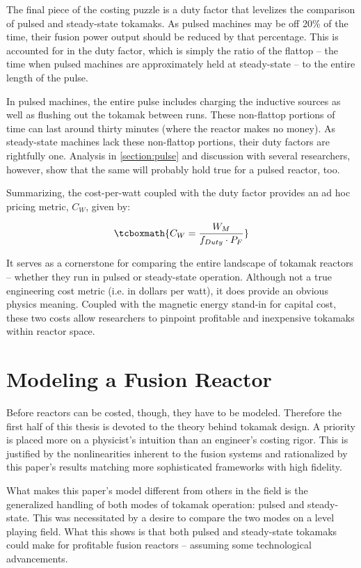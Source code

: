 The final piece of the costing puzzle is a duty factor that levelizes the comparison of pulsed and steady-state tokamaks. As pulsed machines may be off 20\% of the time, their fusion power output should be reduced by that percentage. This is accounted for in the duty factor, which is simply the ratio of the flattop -- the time when pulsed machines are approximately held at steady-state -- to the entire length of the pulse. 

In pulsed machines, the entire pulse includes charging the inductive sources as well as flushing out the tokamak between runs. These non-flattop portions of time can last around thirty minutes (where the reactor makes no money). As steady-state machines lack these non-flattop portions, their duty factors are rightfully one. Analysis in \cref{section:pulse} and discussion with several researchers, however, show that the same will probably hold true for a pulsed reactor, too.

Summarizing, the cost-per-watt coupled with the duty factor provides an ad hoc pricing metric, $C_W$, given by:

\begin{equation}
	\tcboxmath{
	C_W = \frac{W_M}{f_{Duty} \cdot P_F}
	}
\end{equation}

It serves as a cornerstone for comparing the entire landscape of tokamak reactors -- whether they run in pulsed or steady-state operation. Although not a true engineering cost metric (i.e. in dollars per watt), it does provide an obvious physics meaning. Coupled with the magnetic energy stand-in for capital cost, these two costs allow researchers to pinpoint profitable and inexpensive tokamaks within reactor space.

\section{Modeling a Fusion Reactor}

Before reactors can be costed, though, they have to be modeled. Therefore the first half of this thesis is devoted to the theory behind tokamak design. A priority is placed more on a physicist's intuition than an engineer's costing rigor. This is justified by the nonlinearities inherent to the fusion systems and rationalized by this paper's results matching more sophisticated frameworks with high fidelity.

What makes this paper's model different from others in the field is the generalized handling of both modes of tokamak operation: pulsed and steady-state. This was necessitated by a desire to compare the two modes on a level playing field. What this shows is that both pulsed and steady-state tokamaks could make for profitable fusion reactors -- assuming some technological advancements.

